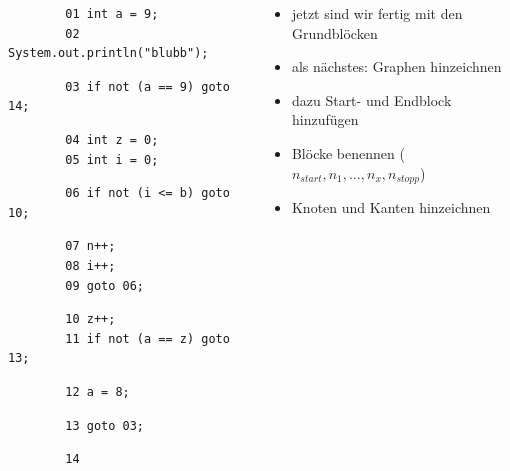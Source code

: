 \documentclass[18pt]{beamer}
\begin{document}
	\begin{frame}[fragile]
\small 
\begin{columns}
	\begin{column}{0.4\textwidth}
		\scriptsize
		\begin{verbatim}
		01 int a = 9;
		02 System.out.println("blubb");
		\end{verbatim}
		\begin{verbatim}
		03 if not (a == 9) goto 14;
		\end{verbatim}
		\begin{verbatim}
		04 int z = 0;
		05 int i = 0;
		\end{verbatim}
		\begin{verbatim}
		06 if not (i <= b) goto 10;
		\end{verbatim}
		\begin{verbatim}
		07 n++;
		08 i++;
		09 goto 06;
		\end{verbatim}
		\begin{verbatim}
		10 z++;
		11 if not (a == z) goto 13;
		\end{verbatim}
		\begin{verbatim}
		12 a = 8;
		\end{verbatim}
		\begin{verbatim}
		13 goto 03;
		\end{verbatim}
		\begin{verbatim}
		14
		\end{verbatim}
	\end{column}%
	\begin{column}{0.6\textwidth}
		\begin{itemize}
			\pause
			\item jetzt sind wir fertig mit den Grundblöcken
			\pause
			\item als nächstes: Graphen hinzeichnen
			\item dazu Start- und Endblock hinzufügen
			\item Blöcke benennen ($n_{start}, n_1, \dots, n_x, n_{stopp}$)
			\item Knoten und Kanten hinzeichnen
		\end{itemize}
	\end{column}
\end{columns}	
\end{frame}
\end{document}

